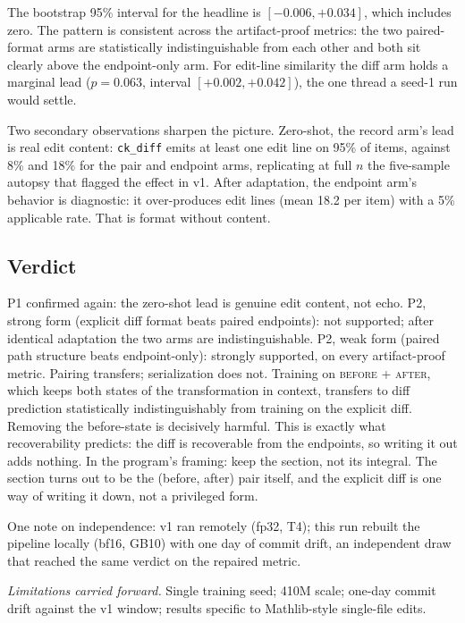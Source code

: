 The bootstrap 95\% interval for the headline is $[-0.006, +0.034]$, which includes zero. The pattern is consistent across the artifact-proof metrics: the two paired-format arms are statistically indistinguishable from each other and both sit clearly above the endpoint-only arm. For edit-line similarity the diff arm holds a marginal lead ($p = 0.063$, interval $[+0.002, +0.042]$), the one thread a seed-1 run would settle.

Two secondary observations sharpen the picture. Zero-shot, the record arm's lead is real edit content: \texttt{ck\_diff} emits at least one edit line on 95\% of items, against 8\% and 18\% for the pair and endpoint arms, replicating at full $n$ the five-sample autopsy that flagged the effect in v1. After adaptation, the endpoint arm's behavior is diagnostic: it over-produces edit lines (mean 18.2 per item) with a 5\% applicable rate. That is format without content.

\subsection{Verdict}

P1 confirmed again: the zero-shot lead is genuine edit content, not echo. P2, strong form (explicit diff format beats paired endpoints): not supported; after identical adaptation the two arms are indistinguishable. P2, weak form (paired path structure beats endpoint-only): strongly supported, on every artifact-proof metric. Pairing transfers; serialization does not. Training on \textsc{before} + \textsc{after}, which keeps both states of the transformation in context, transfers to diff prediction statistically indistinguishably from training on the explicit diff. Removing the before-state is decisively harmful. This is exactly what recoverability predicts: the diff is recoverable from the endpoints, so writing it out adds nothing. In the program's framing: keep the section, not its integral. The section turns out to be the (before, after) pair itself, and the explicit diff is one way of writing it down, not a privileged form.

One note on independence: v1 ran remotely (fp32, T4); this run rebuilt the pipeline locally (bf16, GB10) with one day of commit drift, an independent draw that reached the same verdict on the repaired metric.

\medskip
\noindent\emph{Limitations carried forward.} Single training seed; 410M scale; one-day commit drift against the v1 window; results specific to Mathlib-style single-file edits.
